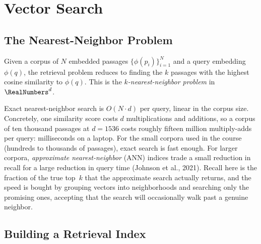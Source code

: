 \section{Vector Search}
\label{section:VectorSearch}

\subsection{The Nearest-Neighbor Problem}

Given a corpus of $N$ embedded passages $\{\phi(p_i)\}_{i=1}^N$ and a query embedding $\phi(q)$, the retrieval problem reduces to finding the $k$ passages with the highest cosine similarity to $\phi(q)$.
This is the \emph{$k$-nearest-neighbor problem} in $\RealNumbers^d$.

Exact nearest-neighbor search is $O(N \cdot d)$ per query, linear in the corpus size.
Concretely, one similarity score costs $d$ multiplications and additions, so a corpus of ten thousand passages at $d = 1536$ costs roughly fifteen million multiply-adds per query: milliseconds on a laptop.
For the small corpora used in the course (hundreds to thousands of passages), exact search is fast enough.
For larger corpora, \emph{approximate nearest-neighbor} (ANN) indices trade a small reduction in recall for a large reduction in query time (Johnson et al., 2021).
Recall here is the fraction of the true top~$k$ that the approximate search actually returns, and the speed is bought by grouping vectors into neighborhoods and searching only the promising ones, accepting that the search will occasionally walk past a genuine neighbor.

\subsection{Building a Retrieval Index}

